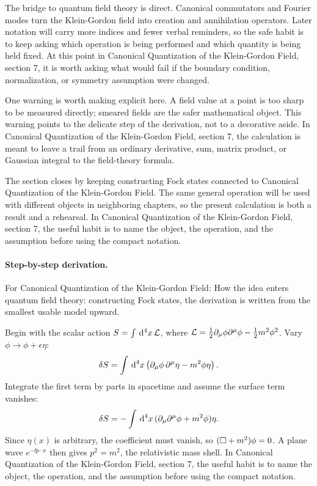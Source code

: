 The bridge to quantum field theory is direct.  Canonical commutators and Fourier modes turn the Klein-Gordon field into creation and annihilation operators.  Later notation will carry more indices and fewer verbal reminders, so the safe habit is to keep asking which operation is being performed and which quantity is being held fixed.  At this point in Canonical Quantization of the Klein-Gordon Field, section 7, it is worth asking what would fail if the boundary condition, normalization, or symmetry assumption were changed.

One warning is worth making explicit here.  A field value at a point is too sharp to be measured directly; smeared fields are the safer mathematical object.  This warning points to the delicate step of the derivation, not to a decorative aside.  In Canonical Quantization of the Klein-Gordon Field, section 7, the calculation is meant to leave a trail from an ordinary derivative, sum, matrix product, or Gaussian integral to the field-theory formula.

The section closes by keeping constructing Fock states connected to Canonical Quantization of the Klein-Gordon Field.  The same general operation will be used with different objects in neighboring chapters, so the present calculation is both a result and a rehearsal.  In Canonical Quantization of the Klein-Gordon Field, section 7, the useful habit is to name the object, the operation, and the assumption before using the compact notation.



\paragraph{Step-by-step derivation.}

For Canonical Quantization of the Klein-Gordon Field: How the idea enters quantum field theory: constructing Fock states, the derivation is written from the smallest usable model upward.

Begin with the scalar action \(S=\int\,\mathrm d^4x\,\mathcal L\), where \(\mathcal L=\frac12\partial_\mu\phi\partial^\mu\phi-\frac12m^2\phi^2\).  Vary \(\phi\to\phi+\epsilon\eta\):
\[
  \delta S=\int\,\mathrm d^4x\left(\partial_\mu\phi\,\partial^\mu\eta-m^2\phi\eta\right).
\]
Integrate the first term by parts in spacetime and assume the surface term vanishes:
\[
  \delta S=-\int\,\mathrm d^4x\,(\partial_\mu\partial^\mu\phi+m^2\phi)\eta.
\]
Since \(\eta(x)\) is arbitrary, the coefficient must vanish, so \((\Box+m^2)\phi=0\).  A plane wave \(e^{-\ii p\cdot x}\) then gives \(p^2=m^2\), the relativistic mass shell.  In Canonical Quantization of the Klein-Gordon Field, section 7, the useful habit is to name the object, the operation, and the assumption before using the compact notation.

